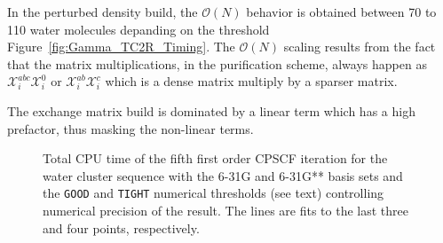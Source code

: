 \documentclass[prl,aps,twocolumn,showpacs,twocolumngrid,superbib]{revtex4}
\def\X{\mathcal{X}}
\begin{document}
In the perturbed density build, the $\mathcal{O}(N)$ behavior is obtained
between 70 to 110 water molecules depanding on the threshold 
Figure~\ref{fig:Gamma_TC2R_Timing}. The $\mathcal{O}(N)$ scaling results 
from the fact that the matrix multiplications, in the purification
scheme, always happen as $\X^{abc}_i\X^{0}_i$ or $\X^{ab}_i\X^{c}_i$
which is a dense matrix multiply by a sparser matrix.

The exchange matrix build is dominated by a linear term which has a high prefactor, thus
masking the non-linear terms.


\begin{figure}[t]
  \caption{\protect
    Total CPU time of the fifth first order CPSCF iteration for
    the water cluster sequence with the 6-31G and 6-31G** 
    basis sets and the {\tt GOOD} and {\tt TIGHT} 
    numerical thresholds (see text) controlling numerical
    precision of the result. The lines are fits to the 
    last three and four points, respectively.
  }\label{fig:Alpha_scaling}
\end{figure}
\end{document}
